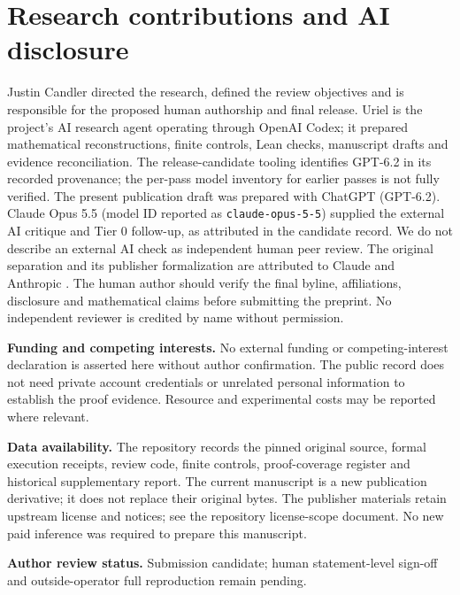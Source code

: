 \documentclass[11pt,letterpaper]{article}
\theoremstyle{definition}\newtheorem{definition}[theorem]{Definition}\newtheorem{example}[theorem]{Example}
\theoremstyle{remark}\newtheorem{remark}[theorem]{Remark}
\begin{document}
\section*{Research contributions and AI disclosure}
Justin Candler directed the research, defined the review objectives and is responsible for the proposed human authorship and final release. Uriel is the project's AI research agent operating through OpenAI Codex; it prepared mathematical reconstructions, finite controls, Lean checks, manuscript drafts and evidence reconciliation. The release-candidate tooling identifies GPT-6.2 in its recorded provenance; the per-pass model inventory for earlier passes is not fully verified. The present publication draft was prepared with ChatGPT (GPT-6.2). Claude Opus 5.5 (model ID reported as \texttt{claude-opus-5-5}) supplied the external AI critique and Tier 0 follow-up, as attributed in the candidate record. We do not describe an external AI check as independent human peer review. The original separation and its publisher formalization are attributed to Claude and Anthropic \cite{claude}. The human author should verify the final byline, affiliations, disclosure and mathematical claims before submitting the preprint. No independent reviewer is credited by name without permission.\par
\textbf{Funding and competing interests.} No external funding or competing-interest declaration is asserted here without author confirmation. The public record does not need private account credentials or unrelated personal information to establish the proof evidence. Resource and experimental costs may be reported where relevant.\par
\textbf{Data availability.} The repository records the pinned original source, formal execution receipts, review code, finite controls, proof-coverage register and historical supplementary report. The current manuscript is a new publication derivative; it does not replace their original bytes. The publisher materials retain upstream license and notices; see the repository license-scope document. No new paid inference was required to prepare this manuscript.\par
\textbf{Author review status.} Submission candidate; human statement-level sign-off and outside-operator full reproduction remain pending.

\appendix
\end{document}
